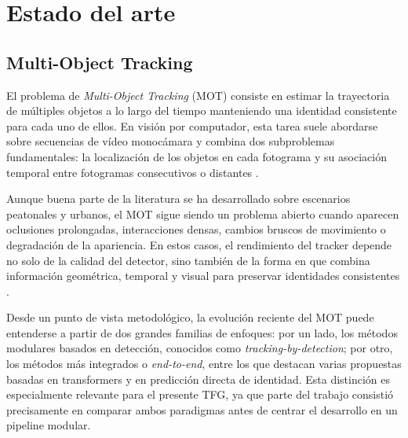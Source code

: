\documentclass[../MAIN.tex]{subfiles}
\begin{document}

\section{Estado del arte}


\subsection{Multi-Object Tracking}

El problema de \textit{Multi-Object Tracking} (MOT) consiste en estimar la trayectoria de múltiples objetos a lo largo del tiempo manteniendo una identidad consistente para cada uno de ellos. En visión por computador, esta tarea suele abordarse sobre secuencias de vídeo monocámara y combina dos subproblemas fundamentales: la localización de los objetos en cada fotograma y su asociación temporal entre fotogramas consecutivos o distantes \parencite{ciaparrone2020survey,zhang2022bytetrack}.

Aunque buena parte de la literatura se ha desarrollado sobre escenarios peatonales y urbanos, el MOT sigue siendo un problema abierto cuando aparecen oclusiones prolongadas, interacciones densas, cambios bruscos de movimiento o degradación de la apariencia. En estos casos, el rendimiento del tracker depende no solo de la calidad del detector, sino también de la forma en que combina información geométrica, temporal y visual para preservar identidades consistentes \parencite{ciaparrone2020survey,hota2020}.

Desde un punto de vista metodológico, la evolución reciente del MOT puede entenderse a partir de dos grandes familias de enfoques: por un lado, los métodos modulares basados en detección, conocidos como \textit{tracking-by-detection}; por otro, los métodos más integrados o \textit{end-to-end}, entre los que destacan varias propuestas basadas en transformers y en predicción directa de identidad. Esta distinción es especialmente relevante para el presente TFG, ya que parte del trabajo consistió precisamente en comparar ambos paradigmas antes de centrar el desarrollo en un pipeline modular.
\end{document}
